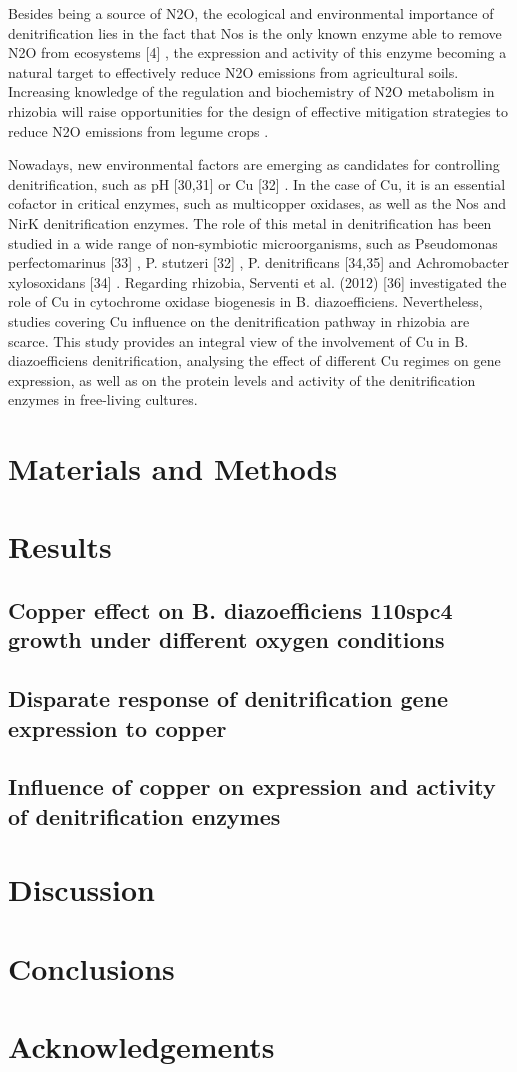 \documentclass[12pt]{article}
\begin{document}
Besides being a source of N2O, the ecological and environmental importance of denitrification
lies in the fact that Nos is the only known enzyme able to remove N2O from
ecosystems [4] \cite{richardson2009mitigating}, the expression and activity of this enzyme becoming a natural target to effectively reduce N2O emissions from agricultural soils. Increasing knowledge of the regulation
and biochemistry of N2O metabolism in rhizobia will raise opportunities for the design of
effective mitigation strategies to reduce N2O emissions from legume crops \cite{bakken2017sources}.


Nowadays, new environmental factors are emerging as candidates for controlling
denitrification, such as pH [30,31] \cite{carreira2020effect}\cite{olaya2021effect} or Cu [32] \cite{black2016influence}. In the case of Cu, it is an essential cofactor in
critical enzymes, such as multicopper oxidases, as well as the Nos and NirK denitrification
enzymes. The role of this metal in denitrification has been studied in a wide range of
non-symbiotic microorganisms, such as Pseudomonas perfectomarinus [33] \cite{matsubara1982modulation}, P. stutzeri [32] \cite{black2016influence},
P. denitrificans [34,35] \cite{felgate2012impact}\cite{sullivan2013copper} and Achromobacter xylosoxidans [34] \cite{felgate2012impact}. Regarding rhizobia, Serventi et al.
(2012) [36] \cite{serventi2012copper} investigated the role of Cu in cytochrome oxidase biogenesis in B. diazoefficiens.
Nevertheless, studies covering Cu influence on the denitrification pathway in rhizobia are
scarce. This study provides an integral view of the involvement of Cu in B. diazoefficiens
denitrification, analysing the effect of different Cu regimes on gene expression, as well as
on the protein levels and activity of the denitrification enzymes in free-living cultures.

\section{Materials and Methods}
\section{Results}
\subsection{Copper effect on B. diazoefficiens 110spc4 growth under different oxygen conditions}
\subsection{Disparate response of denitrification gene expression to copper}
\subsection{Influence of copper on expression and activity of denitrification enzymes}
\section{Discussion}
\section{Conclusions}
\section*{Acknowledgements}



\end{document}
